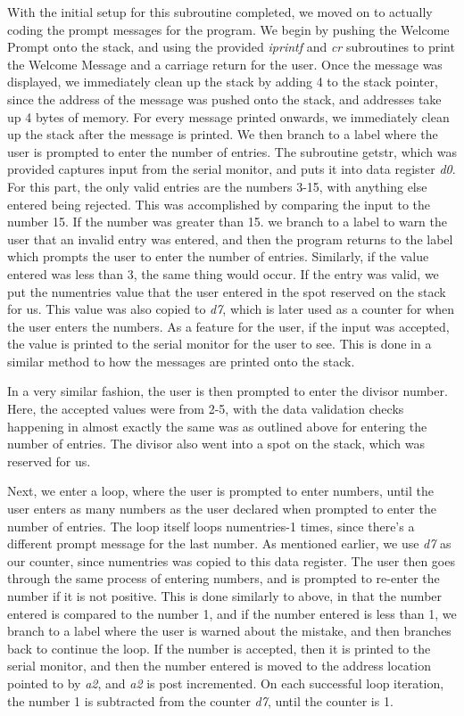 \documentclass[letterpaper]{article}
\begin{document}
    With the initial setup for this subroutine completed, we moved on to
    actually coding the prompt messages for the program. We begin by
    pushing the Welcome Prompt onto the stack, and using the provided \textit{iprintf}
    and \textit{cr} subroutines to print the Welcome Message and a carriage return for the
    user. Once the message was displayed, we immediately clean up the stack by adding 4
    to the stack pointer, since the address of the message was pushed onto the stack,
    and addresses take up 4 bytes of memory. For every message printed onwards,
    we immediately clean up the stack after the message is printed. We then branch to a label where the user
    is prompted to enter the number of entries. The subroutine getstr, which was provided captures input from the serial monitor,
    and puts it into data register \textit{d0}. For this part, the only
    valid entries are the numbers 3-15, with anything else entered being rejected.
    This was accomplished by comparing the input to the number 15. If the number was
    greater than 15. we branch to a label to warn the user that an invalid entry was entered,
    and then the program returns to the label which prompts the user to enter
    the number of entries. Similarly, if the value entered was less than 3, the same thing would occur.
    If the entry was valid, we put the numentries value that the user entered in the spot reserved on the
    stack for us. This value was also copied to \textit{d7}, which is later used as a counter
    for when the user enters the numbers. As a feature for the user, if the input was
    accepted, the value is printed to the serial monitor for the user to see. This is done
    in a similar method to how the messages are printed onto the stack.

    In a very similar fashion, the user is then prompted to enter the divisor number.
    Here, the accepted values were from 2-5, with the data validation checks happening in
    almost exactly the same was as outlined above for entering the number of entries.
    The divisor also went into a spot on the stack, which was reserved for us.

    Next, we enter a loop, where the user is prompted to enter numbers, until
    the user enters as many numbers as the user declared when prompted to enter the number of entries.
    The loop itself loops numentries-1 times, since there's a different prompt message for the
    last number. As mentioned earlier, we use \textit{d7} as our counter, since numentries was
    copied to this data register. The user then goes through the same process of
    entering numbers, and is prompted to re-enter the number if it is not positive.
    This is done similarly to above, in that the number entered is compared to the
    number 1, and if the number entered is less than 1, we branch to a label where
    the user is warned about the mistake, and then branches back to continue the loop.
    If the number is accepted, then it is printed to the serial monitor, and then the
    number entered is moved to the address location pointed to by \textit{a2}, and \textit{a2} is post
    incremented. On each successful loop iteration, the number 1 is subtracted from
    the counter \textit{d7}, until the counter is 1.
\end{document}
